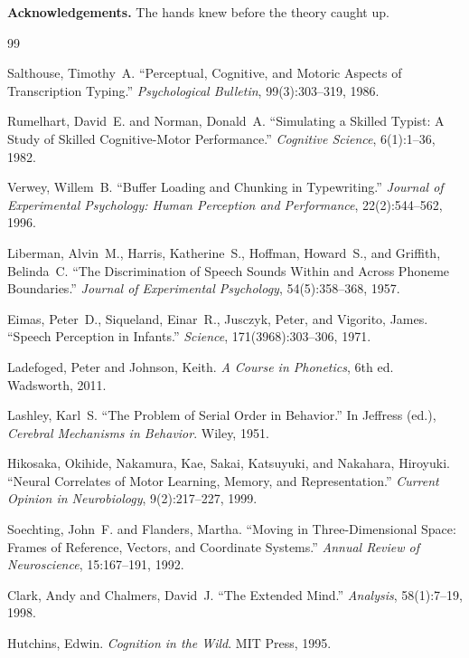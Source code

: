 \documentclass[12pt,a4paper]{article}
\theoremstyle{plain}
\theoremstyle{definition}
\theoremstyle{remark}
\begin{document}
\bigskip

\noindent\textbf{Acknowledgements.} The hands knew before the theory caught up.

\begin{thebibliography}{99}

Salthouse, Timothy~A.
``Perceptual, Cognitive, and Motoric Aspects of Transcription Typing.''
\textit{Psychological Bulletin}, 99(3):303--319, 1986.

Rumelhart, David~E. and Norman, Donald~A.
``Simulating a Skilled Typist: A Study of Skilled Cognitive-Motor Performance.''
\textit{Cognitive Science}, 6(1):1--36, 1982.

Verwey, Willem~B.
``Buffer Loading and Chunking in Typewriting.''
\textit{Journal of Experimental Psychology: Human Perception and Performance},
22(2):544--562, 1996.

Liberman, Alvin~M., Harris, Katherine~S., Hoffman, Howard~S., and Griffith,
Belinda~C.
``The Discrimination of Speech Sounds Within and Across Phoneme Boundaries.''
\textit{Journal of Experimental Psychology}, 54(5):358--368, 1957.

Eimas, Peter~D., Siqueland, Einar~R., Jusczyk, Peter, and Vigorito, James.
``Speech Perception in Infants.''
\textit{Science}, 171(3968):303--306, 1971.

Ladefoged, Peter and Johnson, Keith.
\textit{A Course in Phonetics}, 6th ed.
Wadsworth, 2011.

Lashley, Karl~S.
``The Problem of Serial Order in Behavior.''
In Jeffress (ed.), \textit{Cerebral Mechanisms in Behavior}.
Wiley, 1951.

Hikosaka, Okihide, Nakamura, Kae, Sakai, Katsuyuki, and Nakahara, Hiroyuki.
``Neural Correlates of Motor Learning, Memory, and Representation.''
\textit{Current Opinion in Neurobiology}, 9(2):217--227, 1999.

Soechting, John~F. and Flanders, Martha.
``Moving in Three-Dimensional Space: Frames of Reference, Vectors, and
Coordinate Systems.''
\textit{Annual Review of Neuroscience}, 15:167--191, 1992.

Clark, Andy and Chalmers, David~J.
``The Extended Mind.''
\textit{Analysis}, 58(1):7--19, 1998.

Hutchins, Edwin.
\textit{Cognition in the Wild}.
MIT Press, 1995.


\end{thebibliography}
\end{document}
